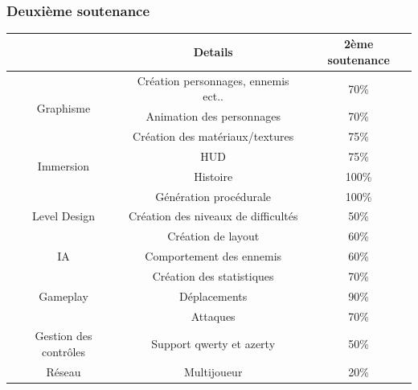 \documentclass[12pt,a4paper]{article}
\begin{document}
\\
\vspace*{1mm}
\normalsize{\subsubsection{Deuxième soutenance}}
\vspace{1cm}

\begin{tabular}{|c|c|c|}
\hline
                              & Details                              & 2ème soutenance \\ \hline
\multirow{3}{*}{Graphisme}    & Création  personnages, ennemis ect.. & 70\%            \\ \cline{2-3} 
                              & Animation des personnages            & 70\%            \\ \cline{2-3} 
                              & Création des matériaux/textures      & 75\%            \\ \hline
\multirow{2}{*}{Immersion}    & HUD                                  & 75\%            \\ \cline{2-3} 
                              & Histoire                             & 100\%           \\ \hline
\multirow{3}{*}{Level Design} & Génération procédurale               & 100\%           \\ \cline{2-3} 
                              & Création des niveaux de difficultés  & 50\%            \\ \cline{2-3} 
                              & Création de layout                   & 60\%            \\ \hline
IA                            & Comportement des ennemis             & 60\%            \\ \hline
\multirow{3}{*}{Gameplay}     & Création des statistiques            & 70\%            \\ \cline{2-3} 
                              & Déplacements                         & 90\%            \\ \cline{2-3} 
                              & Attaques                             & 70\%            \\ \hline
Gestion des contrôles         & Support qwerty et azerty             & 50\%            \\ \hline
Réseau                        & Multijoueur                          & 20\%            \\ \hline
\end{tabular}
\end{document}
